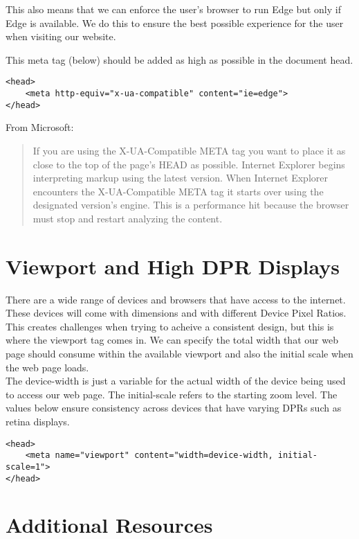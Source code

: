 This also means that we can enforce the user's browser to run Edge but only if Edge is available. We do this to ensure the best possible experience for the user when visiting our website.

This meta tag (below) should be added as high as possible in the document head.

\begin{verbatim}
<head>
    <meta http-equiv="x-ua-compatible" content="ie=edge">
</head>
\end{verbatim}

From Microsoft:

\begin{quotation}
    If you are using the X-UA-Compatible META tag you want to place it as close to the top of the page's HEAD as possible. Internet Explorer begins interpreting markup using the latest version. When Internet Explorer encounters the X-UA-Compatible META tag it starts over using the designated version's engine. This is a performance hit because the browser must stop and restart analyzing the content.
\end{quotation}

\section{Viewport and High DPR Displays}

There are a wide range of devices and browsers that have access to the internet. These devices will come with dimensions and with different Device Pixel Ratios.
\\

This creates challenges when trying to acheive a consistent design, but this is where the viewport tag comes in. We can specify the total width that our web page should consume within the available viewport and also the initial scale when the web page loads.
\\

The device-width is just a variable for the actual width of the device being used to access our web page. The initial-scale refers to the starting zoom level. The values below ensure consistency across devices that have varying DPRs such as retina displays.

\begin{verbatim}
<head>
    <meta name="viewport" content="width=device-width, initial-scale=1">
</head>
\end{verbatim}


\section{Additional Resources}

